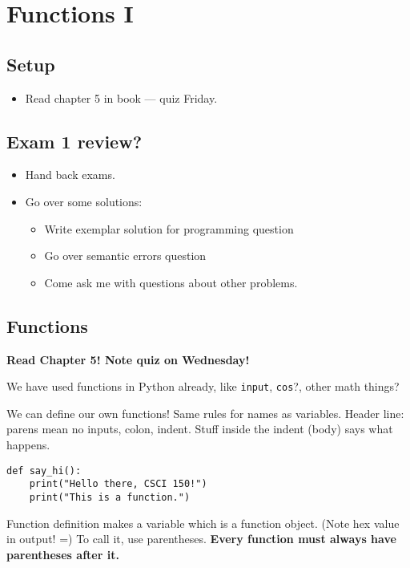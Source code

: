 \documentclass{article}
\begin{document}
\section{Functions I}

\subsection*{Setup}
\begin{itemize}
\item Read chapter 5 in book --- quiz Friday.
\end{itemize}

\subsection*{Exam 1 review?}
\begin{itemize}
\item Hand back exams.
\item Go over some solutions:
  \begin{itemize}
  \item Write exemplar solution for programming question
  \item Go over semantic errors question
  \item Come ask me with questions about other problems.
  \end{itemize}
\end{itemize}

\subsection*{Functions}

\textbf{Read Chapter 5! Note quiz on Wednesday!}

We have used functions in Python already, like \verb|input|,
\verb|cos|?, other math things?

We can define our own functions!  Same rules for names as
variables. Header line: parens mean no inputs, colon, indent.  Stuff
inside the indent (body) says what happens.

\begin{verbatim}
def say_hi():
    print("Hello there, CSCI 150!")
    print("This is a function.")
\end{verbatim}

Function definition makes a variable which is a function object. (Note
hex value in output! =) To call it, use parentheses.  \textbf{Every
  function must always have parentheses after it.}
\end{document}

